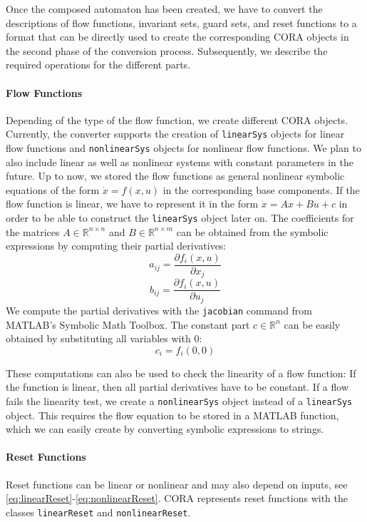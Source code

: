 Once the composed automaton has been created, we have to convert the descriptions of flow functions, invariant sets, guard sets, and reset functions to a format that can be directly used to create the corresponding CORA objects in the second phase of the conversion process. Subsequently, we describe the required operations for the different parts.

\paragraph{Flow Functions}

Depending of the type of the flow function, we create different CORA objects. Currently, the converter supports the creation of \texttt{linearSys} objects for linear flow functions and \texttt{nonlinearSys} objects for nonlinear flow functions. We plan to also include linear as well as nonlinear systems with constant parameters in the future. Up to now, we stored the flow functions as general nonlinear symbolic equations of the form $\dot x = f(x,u)$ in the corresponding base components. If the flow function is linear, we have to represent it in the form $\dot{x} = Ax + Bu + c$ in order to be able to construct the \texttt{linearSys} object later on.
The coefficients for the matrices $A\in\mathbb{R}^{n\times n}$ and $B\in\mathbb{R}^{n\times m}$ can be obtained from the symbolic expressions by computing their partial derivatives:
\[a_{ij} = \frac{\partial f_i(x,u)}{\partial x_j}\]
\[b_{ij} = \frac{\partial f_i(x,u)}{\partial u_j}\]
We compute the partial derivatives with the \texttt{jacobian} command from MATLAB's Symbolic Math Toolbox.
The constant part $c \in \mathbb{R}^n$ can be easily obtained by substituting all variables with $0$:
\[c_i = f_i(0,0)\]

These computations can also be used to check the linearity of a flow function: If the function is linear, then all partial derivatives have to be constant. 
If a flow fails the linearity test, we create a \texttt{nonlinearSys} object instead of a \texttt{linearSys} object.
This requires the flow equation to be stored in a MATLAB function, which we can easily create by converting symbolic expressions to strings.


\paragraph{Reset Functions}

Reset functions can be linear or nonlinear and may also depend on inputs, see \eqref{eq:linearReset}-\eqref{eq:nonlinearReset}.
CORA represents reset functions with the classes \texttt{linearReset} and \texttt{nonlinearReset}.


